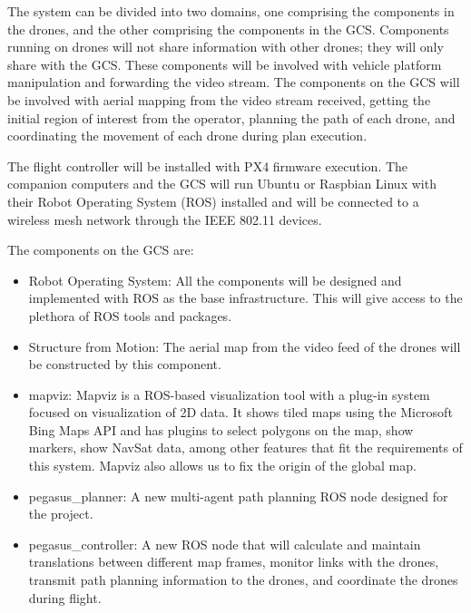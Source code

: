 The system can be divided into two domains, one comprising the components in the drones, and the other comprising the components in the GCS. Components running on drones will not share information with other drones; they will only share with the GCS. These components will be involved with vehicle platform manipulation and forwarding the video stream. The components on the GCS will be involved with aerial mapping from the video stream received, getting the initial region of interest from the operator, planning the path of each drone, and coordinating the movement of each drone during plan execution.

The flight controller will be installed with PX4 firmware execution. The companion computers and the GCS will run Ubuntu or Raspbian Linux with their Robot Operating System (ROS) installed and will be connected to a wireless mesh network through the IEEE 802.11 devices.

The components on the GCS are:
\begin{itemize}
  \item Robot Operating System: All the components will be designed and implemented with ROS as the base infrastructure. This will give access to the plethora of ROS tools and packages.
  \item Structure from Motion: The aerial map from the video feed of the drones will be constructed by this component.
  \item mapviz: Mapviz is a ROS-based visualization tool with a plug-in system focused on visualization of 2D data. It shows tiled maps using the Microsoft Bing Maps API and has plugins to select polygons on the map, show markers, show NavSat data, among other features that fit the requirements of this system. Mapviz also allows us to fix the origin of the global map.
  \item pegasus\_planner: A new multi-agent path planning ROS node designed for the project.
  \item pegasus\_controller: A new ROS node that will calculate and maintain translations between different map frames, monitor links with the drones, transmit path planning information to the drones, and coordinate the drones during flight.
\end{itemize}

